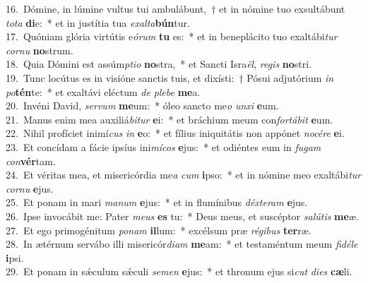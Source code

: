 {16.~}Dómine, in lúmine vultus tui ambulábunt,~† et in nómine tuo exsultábunt \textit{to}\textit{ta} \textbf{di}e:~* et in justítia tua \textit{e}\textit{xal}\textit{ta}\textbf{bún}tur.\\
{17.~}Quóniam glória virtútis e\textit{ó}\textit{rum} \textbf{tu} es:~* et in beneplácito tuo exaltábi\textit{tur} \textit{cor}\textit{nu} \textbf{no}strum.\\
{18.~}Quia Dómini est assúm\textit{pti}\textit{o} \textbf{no}stra,~* et Sancti Isra\textit{ël}, \textit{re}\textit{gis} \textbf{no}stri.\\
{19.~}Tunc locútus es in visióne sanctis tuis, et dixísti:~† Pósui adjutórium \textit{in} \textit{po}\textbf{tén}te:~* et exaltávi eléctum \textit{de} \textit{ple}\textit{be} \textbf{me}a.\\
{20.~}Invéni David, \textit{ser}\textit{vum} \textbf{me}um:~* óleo sancto me\textit{o} \textit{un}\textit{xi} \textbf{e}um.\\
{21.~}Manus enim mea auxiliá\textit{bi}\textit{tur} \textbf{e}i:~* et bráchium meum con\textit{for}\textit{tá}\textit{bit} \textbf{e}um.\\
{22.~}Nihil profíciet inimí\textit{cus} \textit{in} \textbf{e}o:~* et fílius iniquitátis non appónet \textit{no}\textit{cé}\textit{re} \textbf{e}i.\\
{23.~}Et concídam a fácie ipsíus ini\textit{mí}\textit{cos} \textbf{e}jus:~* et odiéntes eum in \textit{fu}\textit{gam} \textit{con}\textbf{vér}tam.\\
{24.~}Et véritas mea, et misericórdia me\textit{a} \textit{cum} \textbf{i}pso:~* et in nómine meo exaltábi\textit{tur} \textit{cor}\textit{nu} \textbf{e}jus.\\
{25.~}Et ponam in mari \textit{ma}\textit{num} \textbf{e}jus:~* et in flumínibus \textit{déx}\textit{te}\textit{ram} \textbf{e}jus.\\
{26.~}Ipse invocábit me: Pater \textit{me}\textit{us} \textbf{es} tu:~* Deus meus, et suscéptor \textit{sa}\textit{lú}\textit{tis} \textbf{me}æ.\\
{27.~}Et ego primogénitum \textit{po}\textit{nam} \textbf{il}lum:~* excélsum præ \textit{ré}\textit{gi}\textit{bus} \textbf{ter}ræ.\\
{28.~}In ætérnum servábo illi misericór\textit{di}\textit{am} \textbf{me}am:~* et testaméntum meum \textit{fi}\textit{dé}\textit{le} \textbf{i}psi.\\
{29.~}Et ponam in sǽculum sǽculi \textit{se}\textit{men} \textbf{e}jus:~* et thronum ejus si\textit{cut} \textit{di}\textit{es} \textbf{cæ}li.\\

